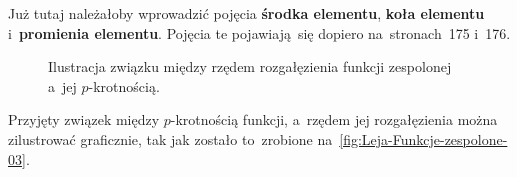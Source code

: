 \documentclass[a4paper,11pt]{article}
\begin{document}
\vspace{\spaceFour}





\noindent
{} Już tutaj należałoby wprowadzić pojęcia \textbf{środka elementu},
\textbf{koła elementu} i~\textbf{promienia elementu}. Pojęcia te
pojawiają~się dopiero na~stronach~175 i~176.

\vspace{\spaceFour}





\begin{figure}[h]

  \centering

  \label{fig:Leja-Funkcje-zespolone-03}


  \caption{Ilustracja związku między rzędem rozgałęzienia funkcji
    zespolonej a~jej $p$-krotnością.}

\end{figure}





\noindent
{} Przyjęty związek między $p$-krotnością funkcji, a~rzędem jej
rozgałęzienia można zilustrować graficznie, tak jak zostało to~zrobione
na~\eqref{fig:Leja-Funkcje-zespolone-03}.
\end{document}
